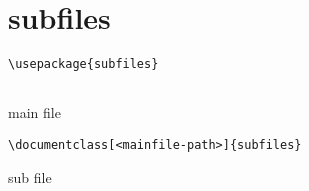 \documentclass[../../latex]{subfiles}
\begin{document}
\section{subfiles}

\begin{minipage}{0.47 \textwidth}
  \begin{listing}[H]
    \begin{verbatim}
\usepackage{subfiles}


    \end{verbatim}
    \caption{main file}
  \end{listing}
\end{minipage}
\hfill
\begin{minipage}{0.47 \textwidth}
  \begin{listing}[H]
    \begin{verbatim}
\documentclass[<mainfile-path>]{subfiles}
    \end{verbatim}
    \caption{sub file}
  \end{listing}
\end{minipage}
\end{document}
